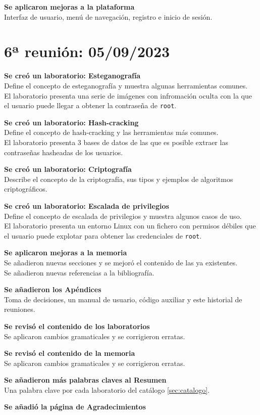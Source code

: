         \textbf{Se aplicaron mejoras a la plataforma} \\
        Interfaz de usuario, menú de navegación, registro e inicio de sesión.


    \section{6ª reunión: 05/09/2023}
        
        \textbf{Se creó un laboratorio: Esteganografía} \\
        Define el concepto de esteganografía y muestra algunas herramientas comunes. \\
        El laboratorio presenta una serie de imágenes con infromación oculta con la que el usuario puede llegar a obtener la contraseña de \texttt{root}.

        \textbf{Se creó un laboratorio: Hash-cracking} \\
        Define el concepto de hash-cracking y las herramientas más comunes. \\
        El laboratorio presenta 3 bases de datos de las que es posible extraer las contraseñas hasheadas de los usuarios.

        \textbf{Se creó un laboratorio: Criptografía} \\
        Describe el concepto de la criptografía, sus tipos y ejemplos de algoritmos criptográficos.

        \textbf{Se creó un laboratorio: Escalada de privilegios} \\
        Define el concepto de escalada de privilegios y muestra algunos casos de uso. \\
        El laboratorio presenta un entorno Linux con un fichero con permisos débiles que el usuario puede explotar para obtener las credenciales de \texttt{root}.

        \textbf{Se aplicaron mejoras a la memoria} \\
        Se añadieron nuevas secciones y se mejoró el contenido de las ya existentes. \\
        Se añadieron nuevas referencias a la bibliografía.

        \textbf{Se añadieron los Apéndices} \\
        Toma de decisiones, un manual de usuario, código auxiliar y este historial de reuniones.

        \textbf{Se revisó el contenido de los laboratorios} \\
        Se aplicaron cambios gramaticales y se corrigieron erratas.
    
        \textbf{Se revisó el contenido de la memoria} \\
        Se aplicaron cambios gramaticales y se corrigieron erratas.

        \textbf{Se añadieron más palabras claves al Resumen} \\
        Una palabra clave por cada laboratorio del catálogo \ref{sec:catalogo}.

        \textbf{Se añadió la página de Agradecimientos} \\
        